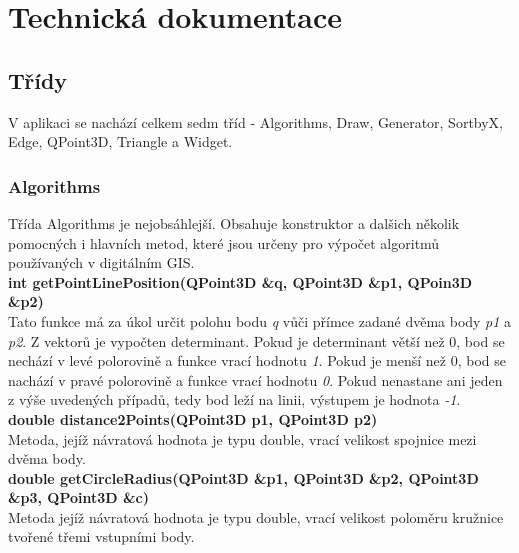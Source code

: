\documentclass[a4paper,11pt,twoside]{article}
\begin{document}

\newpage
{}

\vspace*{-1cm}
\section{Technická dokumentace}

\subsection{Třídy}
V aplikaci se nachází celkem sedm tříd - Algorithms, Draw, Generator, SortbyX, Edge, QPoint3D, Triangle a Widget. 

\subsubsection{Algorithms}
Třída Algorithms je nejobsáhlejší. Obsahuje konstruktor a dalšich několik pomocných i hlavních metod, které jsou určeny pro výpočet algoritmů používaných v digitálním GIS. \\

\noindent\textbf{int getPointLinePosition(QPoint3D \&q, QPoint3D \&p1, QPoin3D \&p2)}\\
Tato funkce má za úkol určit polohu bodu \textit{q} vůči přímce zadané dvěma body \textit{p1} a \textit{p2}. Z vektorů je vypočten determinant. Pokud je determinant větší než 0, bod se nechází v levé polorovině a funkce vrací hodnotu \textit{1}. Pokud je menší než 0, bod se nachází v pravé polorovině a funkce vrací hodnotu \textit{0}.  Pokud nenastane ani jeden z výše uvedených případů, tedy bod leží na linii, výstupem je hodnota \textit{-1}.\\

\noindent\textbf{double distance2Points(QPoint3D p1, QPoint3D p2)}\\
Metoda, jejíž návratová hodnota je typu double, vrací velikost spojnice mezi dvěma body.\\

\noindent\textbf{double getCircleRadius(QPoint3D \&p1, QPoint3D \&p2, QPoint3D \&p3, QPoint3D \&c)}\\
Metoda jejíž návratová hodnota je typu double, vrací velikost poloměru kružnice tvořené třemi vstupními body.\\
\end{document}
